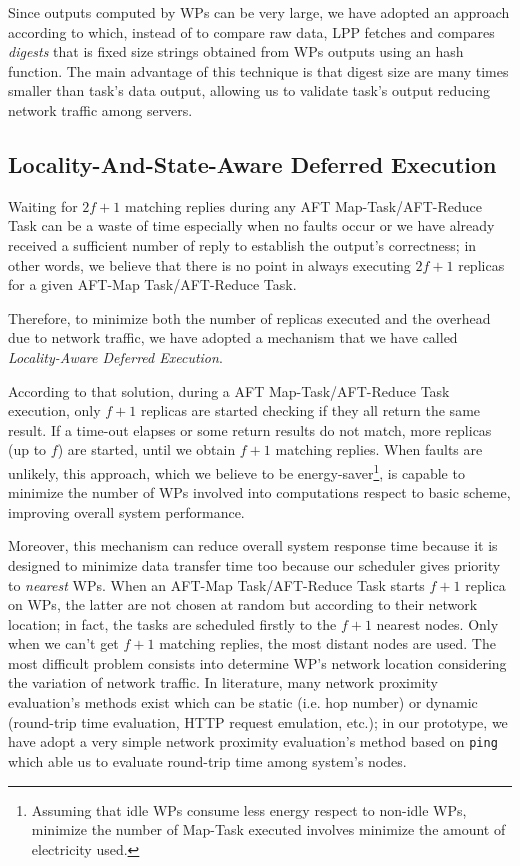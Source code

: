 \documentclass[sigchi]{acmart}
\begin{document}
Since outputs computed by WPs can be very large, we have adopted an approach according to which, instead of to compare raw data, LPP fetches and compares \textit{digests} that is fixed size strings obtained from WPs outputs using an hash function. The main advantage of this technique is that digest size are many times smaller than task's data output, allowing us to validate task's output reducing network traffic among servers.

\subsection{Locality-And-State-Aware Deferred Execution} 

Waiting for $2f + 1$ matching replies during any AFT Map-Task/AFT-Reduce Task can be a waste of time especially when no faults occur or we have already received a sufficient number of reply to establish the output's correctness; in other words, we believe that there is no point in always executing $2f + 1$ replicas for a given AFT-Map Task/AFT-Reduce Task.

Therefore, to minimize both the number of replicas executed and the overhead due to network traffic, we have adopted a mechanism that we have called \textit{Locality-Aware Deferred Execution}. 

According to that solution, during a AFT Map-Task/AFT-Reduce Task execution, only $f + 1$ replicas are started checking if they all return the same result. If a time-out elapses or some return results do not match, more replicas (up to $f$) are started, until we obtain $f + 1$ matching replies. When faults are unlikely, this approach, which we believe to be energy-saver\footnote{Assuming that idle WPs consume less energy respect to non-idle WPs, minimize the number of Map-Task executed involves minimize the amount of electricity used.}, is capable to minimize the number of WPs involved into computations respect to basic scheme, improving overall system performance.

Moreover, this mechanism can reduce overall system response time because it is designed to minimize data transfer time too because our scheduler gives priority to \textit{nearest} WPs. When an AFT-Map Task/AFT-Reduce Task starts $f + 1$ replica on WPs, the latter are not chosen at random but according to their network location; in fact, the tasks are scheduled firstly to the $f + 1$ nearest nodes. Only when we can't get $f + 1$ matching replies, the most distant nodes are used. The most difficult problem consists into determine WP's network location considering the variation of network traffic. In literature, many network proximity evaluation's methods exist which can be static (i.e. hop number) or dynamic (round-trip time evaluation, HTTP request emulation, etc.); in our prototype, we have adopt a very simple network proximity evaluation's method based on \texttt{ping} which able us to evaluate round-trip time among system's nodes. 
\end{document}
